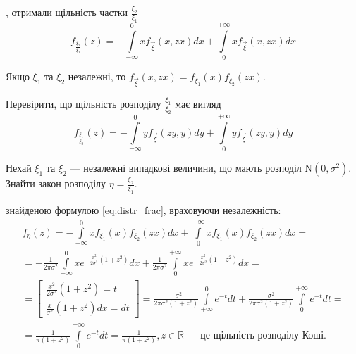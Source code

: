 , отримали щільність частки $\frac{\xi_2}{\xi_1}$ 
\begin{equation}\label{eq:distr_frac}
    f_{\frac{\xi_2}{\xi_1}} (z)= -\int\limits_{-\infty}^0 xf_{\vec{\xi}}(x, zx)dx + 
    \int\limits_0^{+\infty}xf_{\vec{\xi}}(x, zx)dx    
\end{equation}

\begin{remark}
    Якщо $\xi_1$ та $\xi_2$ незалежні, то $f_{\vec{\xi}}(x, zx) = 
    f_{\xi_1}(x)f_{\xi_2}(zx)$.
\end{remark}

\begin{exercise}
    Перевірити, що щільність розподілу $\frac{\xi_1}{\xi_2}$ має вигляд
    \begin{equation}
        f_{\frac{\xi_1}{\xi_2}}(z) = -\int\limits_{-\infty}^0 y f_{\vec {\xi}}(zy, y) dy + \int\limits_0^{+\infty}
        yf_{\vec{\xi}}(zy, y)dy
    \end{equation}
\end{exercise}

\begin{example}
    Нехай $\xi_1$ та $\xi_2$ --- незалежні випадкові величини, що мають розподіл $\mathrm{N}(0, \sigma^2)$. Знайти закон розподілу $\eta = \frac{\xi_2}{\xi_1}$.

     знайденою формулою \eqref{eq:distr_frac}, враховуючи незалежність:
    \begin{gather*}
        f_\eta(z) = - \int\limits_{-\infty}^0 x f_{\xi_1}(x) f_{\xi_2}(zx) dx + 
        \int\limits_{0}^{+\infty} x f_{\xi_1}(x) f_{\xi_2}(zx) dx = 
        \\
        =
        -\frac{1}{2\pi\sigma^2}\int\limits_{-\infty}^0 x e^{-\frac{x^2}{2\sigma^2}\left(1+z^2\right)} dx
        +
        \frac{1}{2\pi\sigma^2}\int\limits_0^{+\infty} x e^{-\frac{x^2}{2\sigma^2}\left(1+z^2\right)}dx = 
        \\
        = \left[
        \begin{array}{c}
            \frac{x^2}{2\sigma^2}\left(1+z^2\right) = t \\
            \frac{x}{\sigma^2}\left(1+z^2\right)dx = dt 
        \end{array}
        \right]
        =
        \frac{-\sigma^2}{2\pi\sigma^2\left(1+z^2\right)}\int\limits_{+\infty}^0 e^{-t} dt
        +
        \frac{\sigma^2}{2\pi\sigma^2\left(1+z^2\right)}\int\limits^{+\infty}_0 e^{-t} dt = 
        \\
        = \frac{1}{\pi(1+z^2)}\int\limits_0^{+\infty}e^{-t}dt = \frac{1}{\pi(1+z^2)}, z \in \mathbb{R}
        \text{ --- це щільність розподілу Коші.} 
    \end{gather*}
\end{example}

